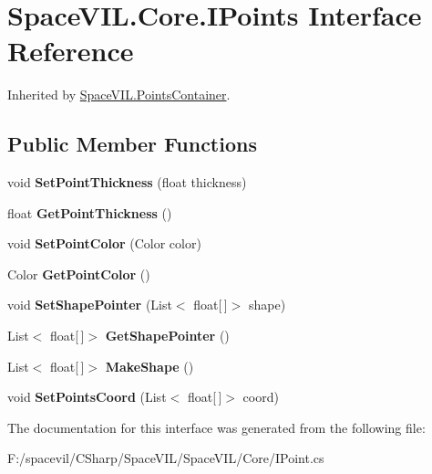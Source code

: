\hypertarget{interface_space_v_i_l_1_1_core_1_1_i_points}{}\section{Space\+V\+I\+L.\+Core.\+I\+Points Interface Reference}
\label{interface_space_v_i_l_1_1_core_1_1_i_points}


Inherited by \mbox{\hyperlink{class_space_v_i_l_1_1_points_container}{Space\+V\+I\+L.\+Points\+Container}}.

\subsection*{Public Member Functions}
\begin{DoxyCompactItemize}
\item 
\mbox{\label{interface_space_v_i_l_1_1_core_1_1_i_points_aceddbf8010ca2bf5749b1568338d8cbe}} 
void {\bfseries Set\+Point\+Thickness} (float thickness)
\item 
\mbox{\label{interface_space_v_i_l_1_1_core_1_1_i_points_a7c12ce35e77fdaa9411f2b268dd952fb}} 
float {\bfseries Get\+Point\+Thickness} ()
\item 
\mbox{\label{interface_space_v_i_l_1_1_core_1_1_i_points_a14b34f813fa022b8012debd8ce4cd90c}} 
void {\bfseries Set\+Point\+Color} (Color color)
\item 
\mbox{\label{interface_space_v_i_l_1_1_core_1_1_i_points_aa68b7d992f67dec150cf4dddcfd714fb}} 
Color {\bfseries Get\+Point\+Color} ()
\item 
\mbox{\label{interface_space_v_i_l_1_1_core_1_1_i_points_a4023971bd1864a861d8c44ee0d8f7095}} 
void {\bfseries Set\+Shape\+Pointer} (List$<$ float\mbox{[}$\,$\mbox{]}$>$ shape)
\item 
\mbox{\label{interface_space_v_i_l_1_1_core_1_1_i_points_a264c082aacca04f7b45049ceecac7876}} 
List$<$ float\mbox{[}$\,$\mbox{]}$>$ {\bfseries Get\+Shape\+Pointer} ()
\item 
\mbox{\label{interface_space_v_i_l_1_1_core_1_1_i_points_a81156696dec6126fc316641f36c41eca}} 
List$<$ float\mbox{[}$\,$\mbox{]}$>$ {\bfseries Make\+Shape} ()
\item 
\mbox{\label{interface_space_v_i_l_1_1_core_1_1_i_points_a21e6a7cec6c1eecc7c9b7a9eb8c8383e}} 
void {\bfseries Set\+Points\+Coord} (List$<$ float\mbox{[}$\,$\mbox{]}$>$ coord)
\end{DoxyCompactItemize}


The documentation for this interface was generated from the following file\+:\begin{DoxyCompactItemize}
\item 
F\+:/spacevil/\+C\+Sharp/\+Space\+V\+I\+L/\+Space\+V\+I\+L/\+Core/I\+Point.\+cs\end{DoxyCompactItemize}
